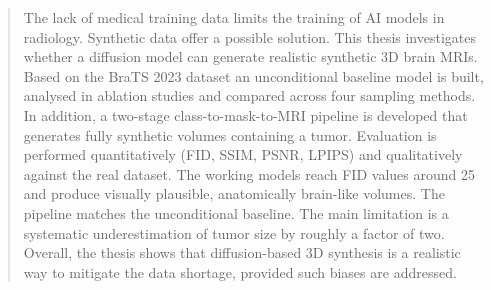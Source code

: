 \renewcommand{\abstractname}{Abstract}
\begin{abstract}
The lack of medical training data limits the training of AI models in radiology. Synthetic data offer a possible solution. This thesis investigates whether a diffusion model can generate realistic synthetic 3D brain MRIs. Based on the BraTS 2023 dataset an unconditional baseline model is built, analysed in ablation studies and compared across four sampling methods. In addition, a two-stage class-to-mask-to-MRI pipeline is developed that generates fully synthetic volumes containing a tumor. Evaluation is performed quantitatively (FID, SSIM, PSNR, LPIPS) and qualitatively against the real dataset. The working models reach FID values around 25 and produce visually plausible, anatomically brain-like volumes. The pipeline matches the unconditional baseline. The main limitation is a systematic underestimation of tumor size by roughly a factor of two. Overall, the thesis shows that diffusion-based 3D synthesis is a realistic way to mitigate the data shortage, provided such biases are addressed.
\end{abstract}